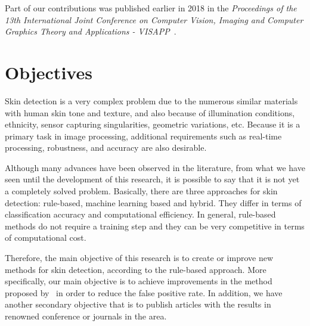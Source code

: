 Part of our contributions was published earlier in 2018 in the \emph{Proceedings of the 13th International Joint Conference on Computer Vision, Imaging and Computer Graphics Theory and Applications - VISAPP}~\citep{faria:18}.


\section{Objectives}
\label{sec:objectives}

Skin detection is a very complex problem due to the numerous similar materials with human skin tone and texture, and also because of illumination conditions, ethnicity, sensor capturing singularities, geometric variations, etc. Because it is a primary task in image processing, additional requirements such as real-time processing, robustness, and accuracy are also desirable.

Although many advances have been observed in the literature, from what we have seen until the development of this research, it is possible to say that it is not yet a completely solved problem. Basically, there are three approaches for skin detection: rule-based, machine learning based and hybrid. They differ in terms of classification accuracy and computational efficiency. In general, rule-based methods do not require a training step and they can be very competitive in terms of computational cost.

Therefore, the main objective of this research is to create or improve new methods for skin detection, according to the rule-based approach. More specifically, our main objective is to achieve improvements in the method proposed by~\citet{brancati:17} in order to reduce the false positive rate. In addition, we have another secondary objective that is to publish articles with the results in renowned conference or journals in the area.



